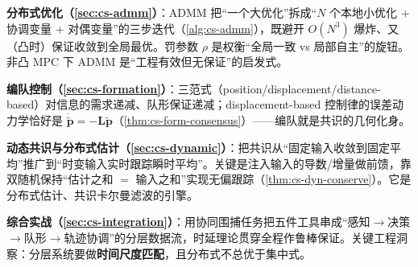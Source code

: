 \textbf{分布式优化（\cref{sec:cs-admm}）}：ADMM 把“一个大优化”拆成“$N$ 个本地小优化 + 协调变量 + 对偶变量”的三步迭代（\cref{alg:cs-admm}），既避开 $O(N^3)$ 爆炸、又（凸时）保证收敛到全局最优。罚参数 $\rho$ 是权衡“全局一致 vs 局部自主”的旋钮。非凸 MPC 下 ADMM 是“工程有效但无保证”的启发式。

\textbf{编队控制（\cref{sec:cs-formation}）}：三范式（position/displacement/distance-based）对信息的需求递减、队形保证递减；displacement-based 控制律的误差动力学恰好是 $\dot{\tilde{\mathbf{p}}}=-\mathbf{L}\tilde{\mathbf{p}}$（\cref{thm:cs-form-consensus}）——编队就是共识的几何化身。

\textbf{动态共识与分布式估计（\cref{sec:cs-dynamic}）}：把共识从“固定输入收敛到固定平均”推广到“时变输入实时跟踪瞬时平均”。关键是注入输入的导数/增量做前馈，靠双随机保持“估计之和 $=$ 输入之和”实现无偏跟踪（\cref{thm:cs-dyn-conserve}）。它是分布式估计、共识卡尔曼滤波的引擎。

\textbf{综合实战（\cref{sec:cs-integration}）}：用协同围捕任务把五件工具串成“感知$\to$决策$\to$队形$\to$轨迹协调”的分层数据流，时延理论贯穿全程作鲁棒保证。关键工程洞察：分层系统要做\textbf{时间尺度匹配}，且分布式不总优于集中式。

